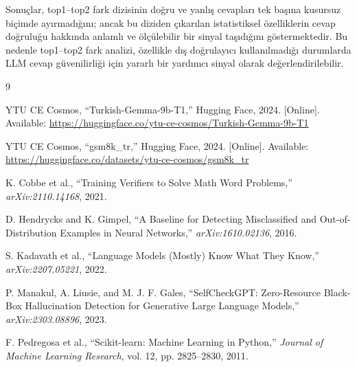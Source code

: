 \documentclass[conference]{IEEEtran}
\begin{document}
Sonuçlar, top1--top2 fark dizisinin doğru ve yanlış cevapları tek başına
kusursuz biçimde ayırmadığını; ancak bu diziden çıkarılan istatistiksel
özelliklerin cevap doğruluğu hakkında anlamlı ve ölçülebilir bir sinyal
taşıdığını göstermektedir. Bu nedenle top1--top2 fark analizi, özellikle dış
doğrulayıcı kullanılmadığı durumlarda LLM cevap güvenilirliği için yararlı bir
yardımcı sinyal olarak değerlendirilebilir.

\begin{thebibliography}{9}

YTU CE Cosmos, ``Turkish-Gemma-9b-T1,'' Hugging Face, 2024.
[Online]. Available: \url{https://huggingface.co/ytu-ce-cosmos/Turkish-Gemma-9b-T1}

YTU CE Cosmos, ``gsm8k\_tr,'' Hugging Face, 2024.
[Online]. Available: \url{https://huggingface.co/datasets/ytu-ce-cosmos/gsm8k_tr}

K. Cobbe et al., ``Training Verifiers to Solve Math Word Problems,''
\emph{arXiv:2110.14168}, 2021.

D. Hendrycks and K. Gimpel, ``A Baseline for Detecting Misclassified and
Out-of-Distribution Examples in Neural Networks,'' \emph{arXiv:1610.02136}, 2016.

S. Kadavath et al., ``Language Models (Mostly) Know What They Know,''
\emph{arXiv:2207.05221}, 2022.

P. Manakul, A. Liusie, and M. J. F. Gales, ``SelfCheckGPT: Zero-Resource
Black-Box Hallucination Detection for Generative Large Language Models,''
\emph{arXiv:2303.08896}, 2023.

F. Pedregosa et al., ``Scikit-learn: Machine Learning in Python,''
\emph{Journal of Machine Learning Research}, vol. 12, pp. 2825--2830, 2011.

\end{thebibliography}
\end{document}
